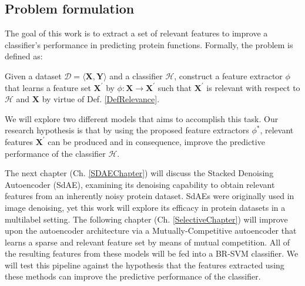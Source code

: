 \subsection{Problem formulation}

\par The goal of this work is to extract a set of relevant features to
improve a classifier's performance in predicting protein functions. Formally,
the problem is defined as:

\begin{definition}
  Given a dataset $\mathcal{D}=\langle \mathbf{X}, \mathbf{Y} \rangle$ and a
  classifier $\mathcal{H}$, construct a feature extractor $\phi$ that learns
  a feature set $\mathbf{X}^{\prime}$ by $\phi: \mathbf{X} \rightarrow
  \mathbf{X}^{\prime}$ such that $\mathbf{X}^{\prime}$ is relevant with respect
  to $\mathcal{H}$ and $\mathbf{X}$ by virtue of Def. \ref{DefRelevance}.
\end{definition}

\par\noindent We will explore two different models that aims to accomplish
this task. Our research hypothesis is that by using the proposed feature
extractors $\phi^{\ast}$, relevant features $\mathbf{X}^{\prime}$ can be
produced and in consequence, improve the predictive performance of the
classifier $\mathcal{H}$.

\par The next chapter (Ch. \ref{SDAEChapter}) will discuss the Stacked
Denoising Autoencoder (SdAE), examining its denoising capability to obtain
relevant features from an inherently noisy protein dataset. SdAEs were
originally used in image denoising, yet this work will explore its efficacy
in protein datasets in a multilabel setting. The following chapter (Ch.
\ref{SelectiveChapter}) will improve upon the autoencoder architecture via a
Mutually-Competitive autoencoder that learns a sparse and relevant feature
set by means of mutual competition. All of the resulting features from these
models will be fed into a BR-SVM classifier. We will test this pipeline
against the hypothesis that the features extracted using these methods can
improve the predictive performance of the classifier.